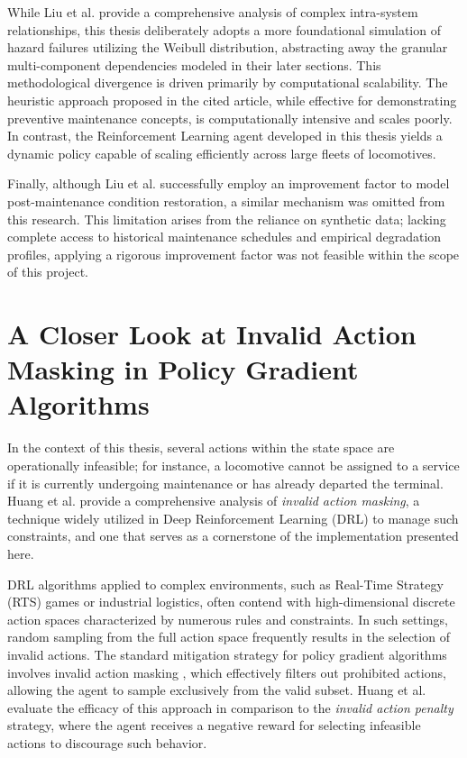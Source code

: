 \documentclass[a4paper]{scrartcl}
\begin{document}
While Liu et al. provide a comprehensive analysis of complex intra-system relationships, this thesis deliberately adopts a more foundational simulation of hazard failures utilizing the Weibull distribution, abstracting away the granular multi-component dependencies modeled in their later sections. This methodological divergence is driven primarily by computational scalability. The heuristic approach proposed in the cited article, while effective for demonstrating preventive maintenance concepts, is computationally intensive and scales poorly. In contrast, the Reinforcement Learning agent developed in this thesis yields a dynamic policy capable of scaling efficiently across large fleets of locomotives.

Finally, although Liu et al. successfully employ an improvement factor \cite{Dongetal2020} to model post-maintenance condition restoration, a similar mechanism was omitted from this research. This limitation arises from the reliance on synthetic data; lacking complete access to historical maintenance schedules and empirical degradation profiles, applying a rigorous improvement factor was not feasible within the scope of this project.


\section{A Closer Look at Invalid Action Masking in Policy Gradient Algorithms}

In the context of this thesis, several actions within the state space are operationally infeasible; for instance, a locomotive cannot be assigned to a service if it is currently undergoing maintenance or has already departed the terminal. Huang et al. \cite{DBLP:journals/corr/abs-2006-14171} provide a comprehensive analysis of \textit{invalid action masking}, a technique widely utilized in Deep Reinforcement Learning (DRL) to manage such constraints, and one that serves as a cornerstone of the implementation presented here.

DRL algorithms applied to complex environments, such as Real-Time Strategy (RTS) games or industrial logistics, often contend with high-dimensional discrete action spaces characterized by numerous rules and constraints. In such settings, random sampling from the full action space frequently results in the selection of invalid actions. The standard mitigation strategy for policy gradient algorithms involves invalid action masking \cite{Suttonetal2000}, which effectively filters out prohibited actions, allowing the agent to sample exclusively from the valid subset. Huang et al. evaluate the efficacy of this approach in comparison to the \textit{invalid action penalty} strategy, where the agent receives a negative reward for selecting infeasible actions to discourage such behavior.
\end{document}
